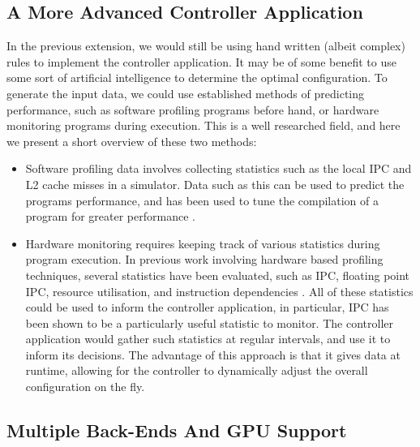 \subsection{A More Advanced Controller Application}
\label{section:conclusion_and_future_work:a_more_advanced_controller_application}

In the previous extension, we would still be using hand written (albeit complex) rules to implement the controller application. It may be of some benefit to use some sort of artificial intelligence to determine the optimal configuration. To generate the input data, we could use established methods of predicting performance, such as software profiling programs before hand, or hardware monitoring programs during execution. This is a well researched field, and here we present a short overview of these two methods:

\begin{itemize}
    \item Software profiling data involves collecting statistics such as the local IPC and L2 cache misses in a simulator. Data such as this can be used to predict the programs performance, and has been used to tune the compilation of a program for greater performance \cite{duesterwald_bala_2000}.
    
    \item Hardware monitoring requires keeping track of various statistics during program execution. In previous work involving hardware based profiling techniques, several statistics have been evaluated, such as IPC, floating point IPC, resource utilisation, and instruction dependencies \cite{bahar_manne_2001, buyuktosunoglu_schuster_brooks_bose_cook_albonesi_2001, folegnani_gonzalez, maro_bai_bahar_2001, ponomarev_kucuk_ghose, sasanka_hughes_adve_2002, seng_tune_tullsen}. All of these statistics could be used to inform the controller application, in particular, IPC has been shown to be a particularly useful statistic to monitor. The controller application would gather such statistics at regular intervals, and use it to inform its decisions. The advantage of this approach is that it gives data at runtime, allowing for the controller to dynamically adjust the overall configuration on the fly.
\end{itemize}



\subsection{Multiple Back-Ends And GPU Support}
\label{section:conclusion_and_future_work:multiple_backends_and_gpu_support}

